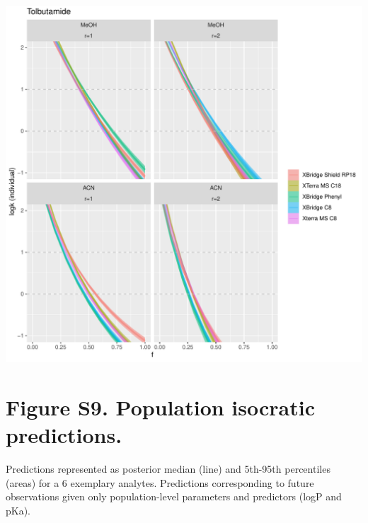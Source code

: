 \documentclass[
]{article}
\begin{document}
\newpage{}

\includegraphics{../figures/izoparam/isopred/Tolbutamide.individual.pdf}

\newpage{}

\hypertarget{figure-s9.-population-isocratic-predictions.}{%
\section{Figure S9. Population isocratic
predictions.}\label{figure-s9.-population-isocratic-predictions.}}

Predictions represented as posterior median (line) and 5th-95th
percentiles (areas) for a 6 exemplary analytes. Predictions
corresponding to future observations given only population-level
parameters and predictors (logP and pKa).
\end{document}
